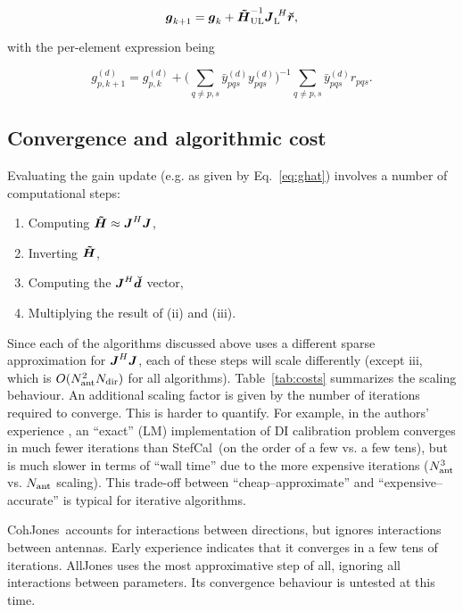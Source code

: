 \documentclass[useAMS,usenatbib]{mn2e}
\newcommand{\mat}[1]{{\bmath{#1}}}
\newcommand{\JJ}{\mat{J}} %
\newcommand{\HHa}{\mat{\tilde{H}}} %
\newcommand{\JHJ}{\JJ^H\JJ} %
\newcommand{\AUG}[1]{\bmath{\breve{#1}}}
\newcommand{\Rr}{\AUG{r}}
\newcommand{\Dd}{\AUG{d}}
\newcommand{\LEFT}{\mathrm{L}}
\newcommand{\UL}{\mathrm{UL}}%
\newcommand{\COH}{{\sc CohJones}}
\newcommand{\StefCal}{{\sc StefCal}}
\begin{document}
\[
\bmath{g}_{k+1} = \bmath{g}_k + \HHa^{-1}_\UL \JJ^{~H}_\LEFT \Rr,
\]

with the per-element expression being 

\begin{equation}
\label{eq:stefcal:dd:unpol}
g_{p,k+1}^{(d)} = g_{p,k}^{(d)} + 
\big( \sum\limits_{q\ne p,s} \bar{y}^{(d)}_{pqs} y^{(d)}_{pqs} \big)^{-1}
\sum\limits_{q\ne p,s} \bar{y}^{(d)}_{pqs} r_{pqs}.
\end{equation}

\subsection{Convergence and algorithmic cost}

Evaluating the gain update (e.g. as given by Eq.~\ref{eq:ghat}) involves a number of computational steps:

\begin{enumerate}
\item Computing $\HHa \approx \JHJ$,
\item Inverting $\HHa$,
\item Computing the $\JJ^H\Dd$ vector,
\item Multiplying the result of (ii) and (iii). 
\end{enumerate}

Since each of the algorithms discussed above uses a different sparse approximation for $\JHJ$, each of these 
steps will scale differently (except iii, which is $O(N_\mathrm{ant}^2N_\mathrm{dir})$ for all algorithms). Table~\ref{tab:costs} 
summarizes the scaling behaviour. 
An additional scaling factor is given by the number of iterations required to converge. This is harder
to quantify. For example, in the authors' experience \citep{OMS-Stefcal}, an ``exact'' (LM) implementation of
DI calibration problem converges in much fewer iterations than \StefCal\ (on the order of a few vs. a few tens), but is much 
slower in terms of ``wall time'' due to the more expensive iterations ($N_\mathrm{ant}^3$ vs. $N_\mathrm{ant}$ scaling). This trade-off  
between ``cheap--approximate'' and ``expensive--accurate'' is typical for iterative algorithms. 

\COH\ accounts for interactions between directions, but ignores interactions between antennas. Early experience 
indicates that it converges in a few tens of iterations. {\sc AllJones} uses the most approximative step of all,
ignoring all interactions between parameters. Its convergence behaviour is untested at this time.
\end{document}

